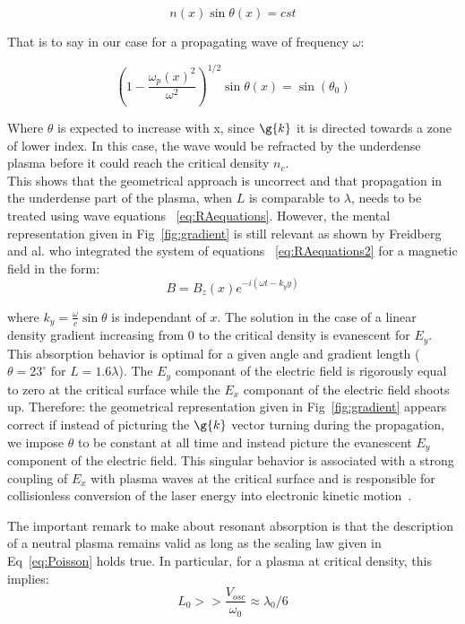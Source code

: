 \begin{equation}
n(x) \sin\theta(x) = cst
\end{equation}

\noindent That is to say in our case for a propagating wave of frequency $\omega$:

\begin{equation}
(1 - \frac{\omega_p(x)^2}{\omega^2})^{1/2}\sin\theta(x) = \sin(\theta_0)
\end{equation}

\noindent Where $\theta$ is expected to increase with x, since $\g{k}$ it is directed towards a zone of lower index. In this case, the wave would be refracted by the underdense plasma before it could reach the critical density $n_c$. \\

\noindent This shows that the geometrical approach is uncorrect and that propagation in the underdense part  of the plasma, when $L$ is comparable to $\lambda$, needs to be treated using wave equations ~\ref{eq:RAequations}. However, the mental representation given in Fig~\ref{fig:gradient} is still relevant as shown by Freidberg and al. \cite{freidberg1972resonant} who integrated the system of equations ~\ref{eq:RAequations2} for a magnetic field in the form:
$$
B = B_z(x)e^{-i(\omega t - k_y y)}
$$

\noindent where $k_y = \frac{\omega}{c}\sin\theta$ is independant of $x$. The solution in the case of a linear density gradient increasing from $0$ to the critical density is evanescent for $E_y$. This absorption behavior is optimal for a given angle and gradient length ($\theta = 23^{\circ}$ for $L = 1.6 \lambda$). The $E_y$ componant of the electric field is rigorously equal to zero at the critical surface while the $E_x$ componant of the electric field shoots up. Therefore: the geometrical representation given in Fig~\ref{fig:gradient} appears correct if instead of picturing the $\g{k}$ vector turning during the propagation, we impose $\theta$ to be constant at all time and instead picture the evanescent $E_y$ component of the electric field.
This singular behavior is associated with a strong coupling of $E_x$ with plasma waves at the critical surface and is responsible for collisionless conversion of the laser energy into electronic kinetic motion~\cite{freidberg1972resonant}.

\noindent The important remark to make about resonant absorption is that the description of a neutral plasma remains valid as long as the scaling law given in Eq~\ref{eq:Poisson} holds true. In particular, for a plasma at critical density, this implies:
$$
L_0 >> \frac{V_{osc}}{\omega_0}\approx \lambda_0/6
$$


